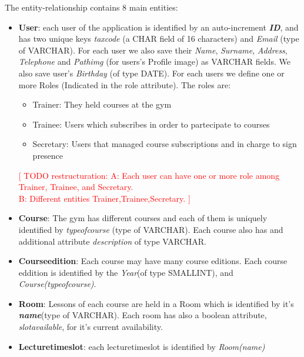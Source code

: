     The entity-relationship contains 8 main entities:
    \begin{itemize}
        \item 
        \textbf{User}: each user of the application is identified by an auto-increment \textit{\textbf{ID}}, and has two unique keys \textit{tax\textunderscore code} (a CHAR field of 16 characters) and \textit{Email} (type of VARCHAR). 
    	For each user we also save their \textit{Name}, \textit{Surname}, \textit{Address}, \textit{Telephone} and \textit{Pathimg} (for users's Profile image) as VARCHAR fields. We also save user's \textit{Birthday} (of type DATE). For each users we define
        one or more Roles (Indicated in the role attribute). The roles are:
        \begin{itemize}
	    \item Trainer: They held courses at the gym 
    	\item Trainee: Users which subscribes in order to partecipate to courses
        \item Secretary: Users that managed course subscriptions and in charge to sign presence
        \end{itemize}
    	\textcolor{red}{[ TODO restructuration: A: Each user can have one or more role among Trainer,  Trainee, and Secretary.\\
    	  B: Different entities Trainer,Trainee,Secretary. ]}
    	
    	\item 
    	\textbf{Course}: The gym has different courses and each of them is uniquely identified by 
    	\textit{type\textunderscore of\textunderscore course} (type of VARCHAR). Each course also has and additional attribute \textit{description} of type VARCHAR.
    	
    	\item 
    	\textbf{Course\textunderscore edition}: Each course may have many course editions. Each course eddition is identified by the \textit{Year}(of type SMALLINT), and \textit{Course(type\textunderscore of\textunderscore course)}.
    	
    	\item 
    	\textbf{Room}: Lessons of each course are held in a Room which is identified by it's \textbf{\textit{name}}(type of VARCHAR). Each room has also a boolean attribute, \textit{slot\textunderscore available}, for it's current availability.
    	
    	\item \textbf{Lecture\textunderscore time\textunderscore slot}: each lecture\textunderscore time\textunderscore slot is identified by \textit{Room(name)}
    	

\end{itemize}
